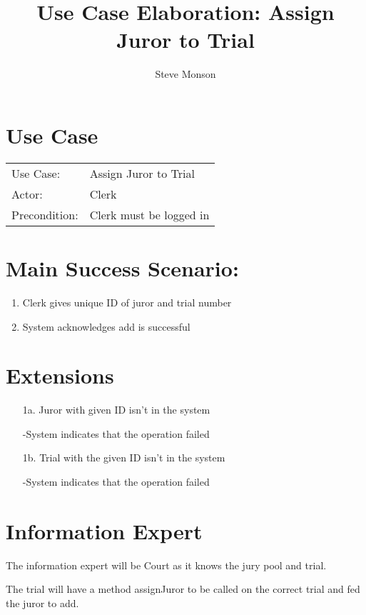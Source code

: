 \documentclass{article}
\title{Use Case Elaboration: Assign Juror to Trial}
\author{Steve Monson}
\begin{document}
\maketitle

\section*{Use Case}
\begin{tabular}{l l}
  Use Case:     & Assign Juror to Trial\\
  Actor:        & Clerk\\
  Precondition: & Clerk must be logged in\\
\end{tabular}

\section*{Main Success Scenario:}
\begin{enumerate}
  \item Clerk gives unique ID of juror and trial number
  \item System acknowledges add is successful
\end{enumerate}

\section*{Extensions}
\begin{itemize}
  \item [1a.] Juror with given ID isn't in the system
  
    -System indicates that the operation failed
  
  \item [1b.] Trial with the given ID isn't in the system

    -System indicates that the operation failed

\end{itemize}

\section*{Information Expert}

The information expert will be Court as it knows the jury pool and trial.

The trial will have a method assignJuror to be called on the correct trial and fed the juror to add. 
\end{document}
